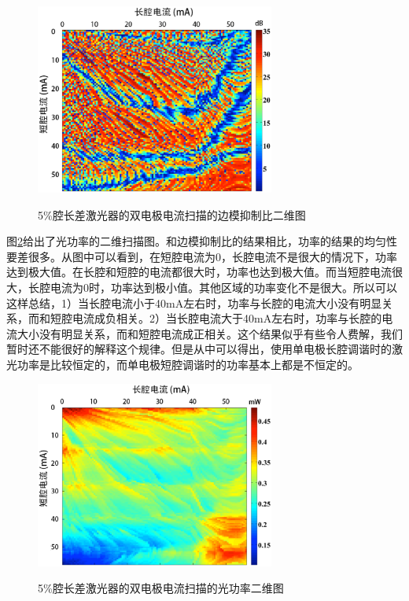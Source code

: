 \documentclass{ZJUthesis}
\begin{document}
\begin{figure}[!ht]
  \centering
  \includegraphics[width=0.7\textwidth]{./Pictures/2d2.eps}\\
  \caption{5\%腔长差激光器的双电极电流扫描的边模抑制比二维图}
  \label{fig_2d2}
\end{figure}

图\ref{fig_2d3}给出了光功率的二维扫描图。和边模抑制比的结果相比，功率的结果的均匀性要差很多。从图中可以看到，在短腔电流为0，长腔电流不是很大的情况下，功率达到极大值。在长腔和短腔的电流都很大时，功率也达到极大值。而当短腔电流很大，长腔电流为0时，功率达到极小值。其他区域的功率变化不是很大。所以可以这样总结，1）当长腔电流小于40mA左右时，功率与长腔的电流大小没有明显关系，而和短腔电流成负相关。2）当长腔电流大于40mA左右时，功率与长腔的电流大小没有明显关系，而和短腔电流成正相关。这个结果似乎有些令人费解，我们暂时还不能很好的解释这个规律。但是从中可以得出，使用单电极长腔调谐时的激光功率是比较恒定的，而单电极短腔调谐时的功率基本上都是不恒定的。

\begin{figure}[!ht]
  \centering
  \includegraphics[width=0.7\textwidth]{./Pictures/2d3.eps}\\
  \caption{5\%腔长差激光器的双电极电流扫描的光功率二维图}
  \label{fig_2d3}
\end{figure}
\end{document}
